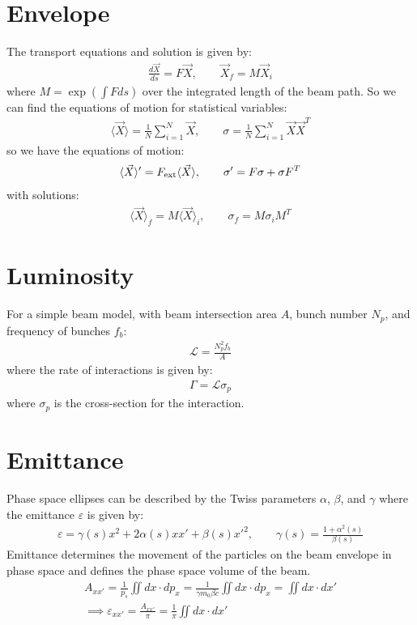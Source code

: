 \documentclass{article}
\numberwithin{equation}{section}
\begin{document}
\section{Envelope}

The transport equations and solution is given by:
\begin{align}
\frac{d \vec{X}}{ds} = F \vec{X} ,\qquad
\vec{X}_f = M \vec{X}_i
\end{align}
where $M = \exp( \int F ds )$ over the integrated length of the beam path. So we can find the equations of motion for statistical variables:
\begin{align}
\langle \vec{X} \rangle = \frac{1}{N} \sum_{i=1}^{N} \vec{X}, \qquad
\sigma = \frac{1}{N} \sum_{i=1}^{N} \vec{X} \vec{X}^T
\end{align}
so we have the equations of motion:
\begin{align}
\langle \vec{X} \rangle' = F_{\rm ext}\langle \vec{X} \rangle, \qquad
\sigma' = F \sigma + \sigma F^T
\end{align}
with solutions:
\begin{align}
\langle \vec{X} \rangle_f = M \langle \vec{X} \rangle_i, \qquad
\sigma_f  = M \sigma_i M^T 
\end{align}

\section{Luminosity}

For a simple beam model, with beam intersection area $A$, bunch number $N_p$, and frequency of bunches $f_b$:
\begin{align}
\mathcal{L} = \frac{N_p^2 f_b}{A}
\end{align}
where the rate of interactions is given by:
\begin{align}
\Gamma = \mathcal{L} \sigma_p
\end{align}
where $\sigma_p$ is the cross-section for the interaction.

\section{Emittance}

Phase space ellipses can be described by the Twiss parameters $\alpha$, $\beta$, and $\gamma$ where the emittance $\varepsilon$ is given by:
\begin{align}
\varepsilon = \gamma(s)x^2 + 2 \alpha(s)x x' + \beta(s) x'^2, \qquad \gamma(s) = \frac{1+\alpha^2(s)}{\beta(s)}
\end{align}
Emittance determines the movement of the particles on the beam envelope in phase space and defines the phase space volume of the beam.
\begin{align}
A_{xx'} = \frac{1}{p_s}\iint dx \cdot dp_x = \frac{1}{\gamma m_0 \beta c} \iint d x \cdot dp_x = \iint dx \cdot dx' \\
\implies \varepsilon_{xx'} = \frac{A_{xx'}}{\pi} = \frac{1}{\pi}\iint dx \cdot dx'
\end{align}
\end{document}
